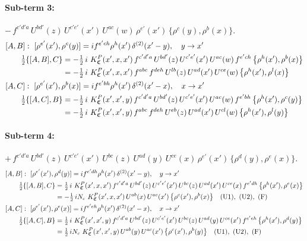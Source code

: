 \documentclass[10pt]{article}
\numberwithin{equation}{section}
\begin{document}
\paragraph{Sub-term 3:} $-\,f^{c'd'a}\,U^{bd'}(z)\,U^{c'e'}(x')\,U^{ac}(w)\,\rho^{e'}(x')\,\big\{\rho^{c}(y),\rho^{b}(x)\big\}$.
\begin{align}
&[A,B]:\ [\rho^{e'}(x'),\rho^{c}(y)]=i f^{e'ch}\rho^{h}(x')\,\delta^{(2)}(x'-y),\quad y\to x'\notag\\
&\qquad \tfrac12\{[A,B],C\}=-\tfrac12\,i\,\,K^{P}_{\mathfrak C}(x',x,x')\,f^{c'd'a}\,U^{bd'}(z)\,U^{c'e'}(x')\,U^{ac}(w)\,f^{e'ch}\,\big\{\rho^{h}(x'),\rho^{b}(x)\big\}\notag\\
&\qquad\phantom{\tfrac12\{[A,B],C\}}=-\tfrac12\,i\,\,K^{P}_{\mathfrak C}(x',x,x')\,f^{abc}\,f^{deh}\,U^{lb}(z)\,U^{ad}(x')\,U^{ce}(w)\,\big\{\rho^{h}(x'),\rho^{l}(x)\big\}
\label{eq:GIII.III.P-3-AB}\\
&[A,C]:\ [\rho^{e'}(x'),\rho^{b}(x)]=i f^{e'bh}\rho^{h}(x')\,\delta^{(2)}(x'-x),\quad x\to x'\notag\\
&\qquad \tfrac12\{[A,C],B\}=-\tfrac12\,i\,\,K^{P}_{\mathfrak C}(x',x',y)\,f^{c'd'a}\,U^{bd'}(z)\,U^{c'e'}(x')\,U^{ac}(w)\,f^{e'bh}\,\big\{\rho^{h}(x'),\rho^{c}(y)\big\}\notag\\
&\qquad\phantom{\tfrac12\{[A,C],B\}}=-\tfrac12\,i\,\,K^{P}_{\mathfrak C}(x',x',y)\,f^{abc}\,f^{deh}\,U^{eb}(z)\,U^{ad}(x')\,U^{cl}(w)\,\big\{\rho^{h}(x'),\rho^{l}(y)\big\}
\label{eq:GIII.III.P-3-AC}
\end{align}
\paragraph{Sub-term 4:} $+\,f^{c'd'a}\,U^{bd'}(z)\,U^{c'e'}(x')\,U^{bc}(z)\,U^{ad}(y)\,U^{ce}(x)\,\rho^{e'}(x')\,\big\{\rho^{d}(y),\rho^{e}(x)\big\}$.
\begin{align}
&[A,B]:\ [\rho^{e'}(x'),\rho^{d}(y)]=i f^{e'dh}\rho^{h}(x')\,\delta^{(2)}(x'-y),\quad y\to x'\notag\\
&\qquad \tfrac12\{[A,B],C\}=\tfrac12\,i\,\,K^{P}_{\mathfrak C}(x',x,x')\,f^{c'd'a}\,U^{bd'}(z)\,U^{c'e'}(x')\,U^{bc}(z)\,U^{ad}(x')\,U^{ce}(x)\,f^{e'dh}\,\big\{\rho^{h}(x'),\rho^{e}(x)\big\}\notag\\
&\qquad\phantom{\tfrac12\{[A,B],C\}}=-\tfrac12\,i N_{c}\,\,K^{P}_{\mathfrak C}(x',x,x')\,U^{ab}(x)\,U^{ac}(x')\,\big\{\rho^{c}(x'),\rho^{b}(x)\big\}\quad\text{(U1)},\ \text{(U2)},\ \text{(F)}
\label{eq:GIII.III.P-4-AB}\\
&[A,C]:\ [\rho^{e'}(x'),\rho^{e}(x)]=i f^{e'eh}\rho^{h}(x')\,\delta^{(2)}(x'-x),\quad x\to x'\notag\\
&\qquad \tfrac12\{[A,C],B\}=\tfrac12\,i\,\,K^{P}_{\mathfrak C}(x',x',y)\,f^{c'd'a}\,U^{bd'}(z)\,U^{c'e'}(x')\,U^{bc}(z)\,U^{ad}(y)\,U^{ce}(x')\,f^{e'eh}\,\big\{\rho^{h}(x'),\rho^{d}(y)\big\}\notag\\
&\qquad\phantom{\tfrac12\{[A,C],B\}}=\tfrac12\,i N_{c}\,\,K^{P}_{\mathfrak C}(x',x',y)\,U^{ab}(y)\,U^{ac}(x')\,\big\{\rho^{c}(x'),\rho^{b}(y)\big\}\quad\text{(U1)},\ \text{(U2)},\ \text{(F)}
\label{eq:GIII.III.P-4-AC}
\end{align}
\end{document}
